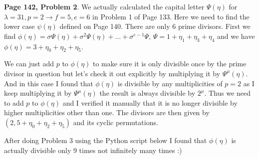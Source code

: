 \documentclass[aps,preprint,preprintnumbers,nofootinbib,showpacs,prd]{revtex4-1}
\begin{document}
{\bf Page 142, Problem 2}. We actually calculated the capital letter $\Psi(\eta)$ for $\lambda = 31, p = 2 \to f = 5, e = 6$ in Problem 1 of Page 133. Here we need to find the lower case $\psi(\eta)$ defined on Page 140. There are only 6 prime divisors. First we find $\phi(\eta) = \sigma\Psi(\eta) + \sigma^2\Psi(\eta) + \dots + \sigma^{e - 1}\Psi$, $\Psi = 1 + \eta_1 + \eta_3 + \eta_4$ and we have $\phi(\eta) = 3 + \eta_0 + \eta_2 + \eta_5$.

We can just add $p$ to $\phi(\eta)$ to make sure it is only divisible once by the prime divisor in question but let's check it out explicitly by multiplying it by $\Psi^\mu(\eta)$. And in this case I found that $\phi(\eta)$ is divisible by any multiplicities of $p = 2$ as I keep multiplying it by $\Psi^\mu(\eta)$ the result is always divisible by $2^\mu$. Thus we need to add $p$ to $\phi(\eta)$ and I verified it manually that it is no longer divisible by higher multiplicities other than one. The divisors are then given by $(2, 5 + \eta_0 + \eta_2 + \eta_5)$ and its cyclic permutations. 

After doing Problem 3 using the Python script below I found that $\phi(\eta)$ is actually divisible only 9 times not infinitely many times :)
\end{document}
